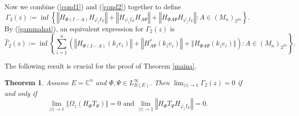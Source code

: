 \documentclass{article}%
\newtheorem{theorem}{Theorem}[section]
\begin{document}
Now we combine (\ref{cond1}) and (\ref{cond2}) together to define%
\[
\Gamma_{2}(z):=\inf\left\{  \left\Vert H_{\Phi(I-A)}H_{\overline
{\varphi_{\overline{z}}}I_{E}}\right\Vert +\left\Vert H_{\overline
{\varphi_{\overline{z}}}I_{E}}H_{A\Psi}\right\Vert +\left\Vert H_{\Phi A\Psi
}H_{\overline{\varphi_{\overline{z}}}I_{E}}\right\Vert :A\in\left(
M_{n}\right)  _{2^{2n}}\right\}  .
\]
By (\ref{gammahat}), an equivalent expression for $\Gamma_{2}(z)$ is
\[
\widehat{\Gamma}_{2}(z):=\inf\left\{  \sum_{i=1}^{n}\left(  \left\Vert
H_{\Phi(I-A)}\left(  k_{z}e_{i}\right)  \right\Vert +\left\Vert H_{A\Psi
}^{\ast}\left(  k_{\overline{z}}e_{i}\right)  \right\Vert +\left\Vert H_{\Phi
A\Psi}\left(  k_{z}e_{i}\right)  \right\Vert \right)  :A\in\left(
M_{n}\right)  _{2^{2n}}\right\}  .
\]


The following result is crucial for the proof of Theorem \ref{maina}.

\begin{theorem}
\label{crucial2}Assume $E=\mathbb{C}^{n}$ and $\Phi,\Psi\in L_{B(E)}^{\infty
}.$ Then $\lim_{\left\vert z\right\vert \rightarrow1}\Gamma_{2}(z)=0$ if and
only if
\begin{equation}
\lim_{\left\vert z\right\vert \rightarrow1}\left\Vert \Omega_{z}(H_{\Phi
}T_{\Psi})\right\Vert =0\text{ and }\lim_{\left\vert z\right\vert
\rightarrow1}\left\Vert H_{\Phi}T_{\Psi}H_{\overline{\varphi_{\overline{z}}%
}I_{E}}\right\Vert =0. \label{cond2b}%
\end{equation}

\end{theorem}
\end{document}
